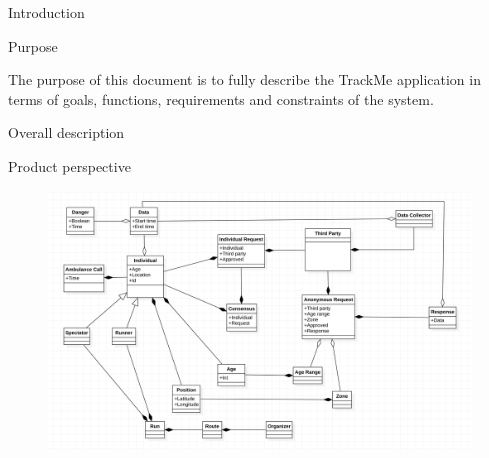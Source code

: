 \documentclass{article}
\begin{document}
	\begin{legal}\bfseries
	
 	\item {Introduction}
  		\begin{legal}\bfseries
    		\item Purpose
		\end{legal}
	{\normalfont The purpose of this document is to fully describe the TrackMe application in terms of goals, functions, requirements and constraints of the system.}
\newpage
 	\item {Overall description}
  		\begin{legal}\bfseries
    		\item Product perspective
		\end{legal}
	\begin{figure}[H]
  	\includegraphics[width=\linewidth]{UML1-0.png}
	\end{figure}
	

\end{legal}
\end{document}
